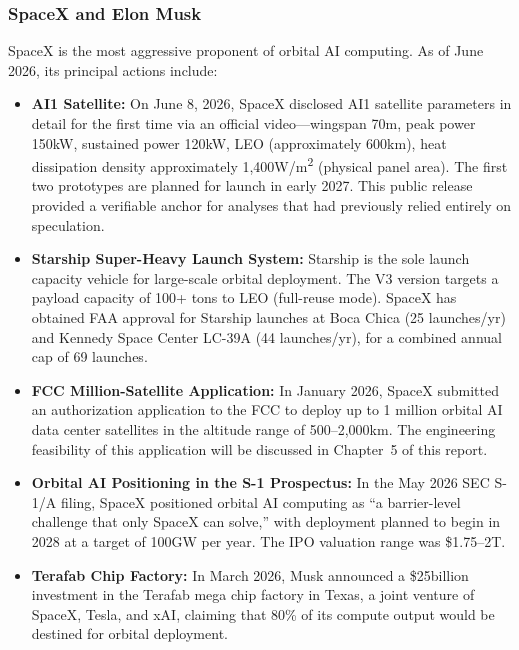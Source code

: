 \subsubsection{SpaceX and Elon Musk}

SpaceX is the most aggressive proponent of orbital AI computing. As of June 2026, its principal actions include:

\begin{itemize}[leftmargin=*]
    \item \textbf{AI1 Satellite:} On June 8, 2026, SpaceX disclosed AI1 satellite parameters in detail for the first time via an official video---wingspan 70\;m, peak power 150\;kW, sustained power 120\;kW, LEO (approximately 600\;km), heat dissipation density approximately 1,400\;W/m\textsuperscript{2} (physical panel area). The first two prototypes are planned for launch in early 2027. This public release provided a verifiable anchor for analyses that had previously relied entirely on speculation\cite{spacex2026ai1}.
    \item \textbf{Starship Super-Heavy Launch System:} Starship is the sole launch capacity vehicle for large-scale orbital deployment. The V3 version targets a payload capacity of 100+ tons to LEO (full-reuse mode). SpaceX has obtained FAA approval for Starship launches at Boca Chica (25 launches/yr) and Kennedy Space Center LC-39A (44 launches/yr), for a combined annual cap of 69 launches\cite{faa2025boca,faa2026ksc}.
    \item \textbf{FCC Million-Satellite Application:} In January 2026, SpaceX submitted an authorization application to the FCC to deploy up to 1 million orbital AI data center satellites in the altitude range of 500--2,000\;km. The engineering feasibility of this application will be discussed in Chapter~5 of this report\cite{spacex2026fcc}.
    \item \textbf{Orbital AI Positioning in the S-1 Prospectus:} In the May 2026 SEC S-1/A filing, SpaceX positioned orbital AI computing as ``a barrier-level challenge that only SpaceX can solve,'' with deployment planned to begin in 2028 at a target of 100\;GW per year. The IPO valuation range was \$1.75--2\;T\cite{spacex2026s1}.
    \item \textbf{Terafab Chip Factory:} In March 2026, Musk announced a \$25\;billion investment in the Terafab mega chip factory in Texas, a joint venture of SpaceX, Tesla, and xAI, claiming that 80\% of its compute output would be destined for orbital deployment\cite{musk2026terafab}.
\end{itemize}

